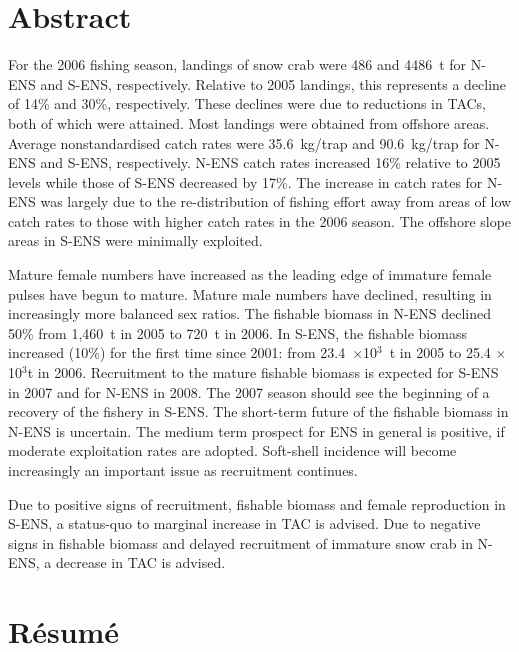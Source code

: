 \documentclass[11pt]{article}
\newcommand{\thou}{10$^3$}
\newcommand{\mult}{$\times$}
\begin{document}
\section*{Abstract}

For the 2006 fishing season, landings of snow crab were 486 and 4486~t for N-ENS and S-ENS, respectively. Relative to 2005 landings, this represents a decline of 14\% and 30\%, respectively. These declines were due to reductions in TACs, both of which were attained. Most landings were obtained from offshore areas. Average nonstandardised catch rates were 35.6~kg/trap and 90.6~kg/trap for N-ENS and S-ENS, respectively. N-ENS catch rates increased 16\% relative to 2005 levels while those of S-ENS decreased by 17\%. The increase in catch rates for N-ENS was largely due to the re-distribution of fishing effort away from areas of low catch rates to those with higher catch rates in the 2006 season. The offshore slope areas in S-ENS were minimally exploited.

Mature female numbers have increased as the leading edge of immature female pulses have begun to mature. Mature male numbers have declined, resulting in increasingly more balanced sex ratios. The fishable biomass in N-ENS declined 50\% from 1,460~t in 2005 to 720~t in 2006. In S-ENS, the fishable biomass increased (10\%) for the first time since 2001: from 23.4~\mult \thou ~t in 2005 to 25.4 \mult \thou t in 2006. Recruitment to the mature fishable biomass is expected for S-ENS in 2007 and for N-ENS in 2008. The 2007 season should see the beginning of a recovery of the fishery in S-ENS. The short-term future of the fishable biomass in N-ENS is uncertain. The medium term prospect for ENS in general is positive, if moderate exploitation rates are adopted. Soft-shell incidence will become increasingly an important issue as recruitment continues.

Due to positive signs of recruitment, fishable biomass and female reproduction in S-ENS, a status-quo to marginal increase in TAC is advised. Due to negative signs in fishable biomass and delayed recruitment of immature snow crab in N-ENS, a decrease in TAC is advised. 


\newpage
\section*{R\'{e}sum\'{e}}
\end{document}
